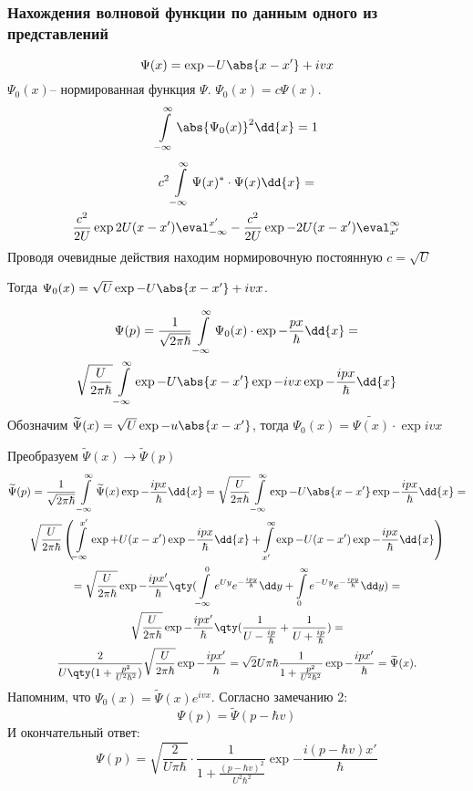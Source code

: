 \subsubsection{Нахождения волновой функции по данным одного из представлений}

$$\Psi(x)= \exp{-U\abs{x-x'} +ivx  }$$
$\Psi_0(x)$-- нормированная функция $\Psi$. $\Psi_0(x)=c\Psi(x)$.
$$\infint \abs{\Psi_0(x)}^2 \dd{x}=1$$
\begin{gather*}
	c^2\infint \Psi(x)^*\cdot\Psi(x)\dd{x}=
	\\ \frac{c^2}{2U}\exp{2U(x-x')}\eval_{-\infty}^{x'}- 
	\frac{c^2}{2U}\exp{-2U(x-x')}
	\eval^{\infty}_{x'}
\end{gather*}
Проводя очевидные действия находим нормировочную постоянную $c=\sqrt{U}$

Тогда $\Psi_0(x)=\sqrt{U}\exp{-U\abs{x-x'}+ivx}$.

\begin{gather*}
\Psi(p)=\frac{1}{\sqrt{2\pi\hbar}}\infint \Psi_0(x)\cdot\exp{-\frac{px}{\hbar}} \dd{x}=\\
\sqrt\frac{U}{2 \pi \hbar } \infint \exp{-U\abs{x-x'}}\exp{-ivx}\exp{-\frac{ipx}{\hbar}} \dd{x}
\end{gather*}
Обозначим $\tilde{\Psi}(x)=\sqrt{U} \exp{-u\abs{x-x'}}$,
 тогда $\Psi_0(x)=\tilde{\Psi(x)}\cdot\exp{ivx}$

Преобразуем $\tilde{\Psi}(x)\longrightarrow \tilde{\Psi}(p)$ 
\begin{gather*}
	\tilde{\Psi}(p)=\frac{1}{\sqrt{2\pi\hbar}}\infint\tilde\Psi(x)\exp{-\frac{ipx}{\hbar}} \dd{x} =\sqrt{\frac{U}{2 \pi \hbar}} \infint \exp{-U\abs{x-x'}}\exp{-\frac{ipx}{\hbar}}\dd{x} =\\
	\sqrt{\frac{U}{2 \pi \hbar}} \left(
	\int\limits_{-\infty}^{x'} \exp{+U (x-x')}\exp{-\frac{ipx}{\hbar}}\dd{x} 
	+
	\int\limits^{\infty}_{x'} \exp{-U (x-x')}\exp{-\frac{ipx}{\hbar}}\dd{x}
	\right)\\=
	\sqrt{\frac{U}{2 \pi \hbar }}\exp{-\frac{ipx' }{\hbar}}
	\qty
	(\int\limits_{-\infty}^0 e^{Uy} e^{-\frac{ipy}{\hbar}}\dd y+
	\int\limits^{\infty}_0 e^{-Uy} e^{-\frac{ipy}{\hbar}}\dd y
	 )
	 =\\
	 \sqrt{\frac{U}{2 \pi \hbar}} \exp{-\frac{ipx' }{\hbar}} 
	 \qty(\frac{1}{U-\frac{ip}{\hbar}} + \frac{1}{U+\frac{ip}{\hbar}})=\\
	 \frac{2}{U\qty(1+\frac{p^2}{U^2\hbar^2})}\sqrt{\frac{U}{2 \pi \hbar}} \exp{-\frac{ipx'}{\hbar}}=\sqrt{2}{U \pi \hbar} \frac{1}{1+\frac{p^2}{U^2\hbar^2}}\exp{-\frac{ipx' }{\hbar}}=\tilde {\Psi}(x). 
\end{gather*}
Напомним, что $\Psi_0(x)=\tilde\Psi(x)e^{ivx}$. Согласно замечанию 2:
	 $$\Psi(p)=\tilde{\Psi}(p-\hbar v)$$
И окончательный ответ:
	 $$\Psi(p)=\sqrt{\frac{2}{U\pi\hbar}}\cdot\frac{1}{1+\frac{(p-\hbar v)^2}{U^2\hbar^2}}\exp{-\frac{i(p-\hbar v)x' }{\hbar}} $$